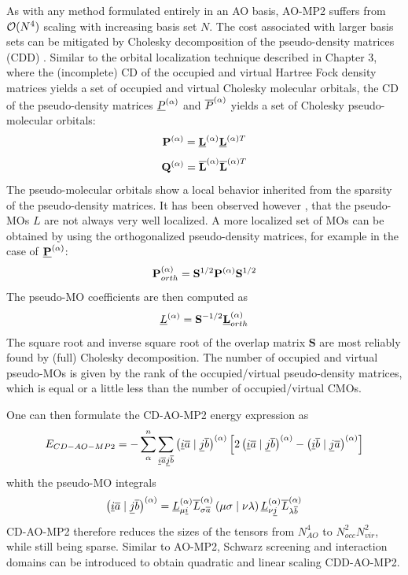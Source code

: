 As with any method formulated entirely in an AO basis, AO-MP2 suffers from $\mathcal{O}(N^{4})$ scaling with increasing basis set $N$. The cost associated with larger basis sets can be mitigated by Cholesky decomposition of the pseudo-density matrices (CDD) \cite{Zie2009}. Similar to the orbital localization technique described in Chapter 3, where the (incomplete) CD of the occupied and virtual Hartree Fock density matrices yields a set of occupied and virtual Cholesky molecular orbitals, the CD of the pseudo-density matrices $\underline{P}^{(\alpha)}$ and $\overline{P}^{(\alpha)}$ yields a set of Cholesky pseudo-molecular orbitals: 
\begin{equation}
\mathbf{P}^{(\alpha)} = \mathbf{\underline{L}}^{(\alpha)} \mathbf{\underline{L}}^{(\alpha)T}
\end{equation}
\begin{equation}
\mathbf{Q}^{(\alpha)} = \mathbf{\overline{L}}^{(\alpha)} \mathbf{\overline{L}}^{(\alpha)T}
\end{equation} 
\noindent The pseudo-molecular orbitals show a local behavior inherited from the sparsity of the pseudo-density matrices. It has been observed however \cite{Lue2017}, that the pseudo-MOs $L$ are not always very well localized. A more localized set of MOs can be obtained by using the orthogonalized pseudo-density matrices, for example in the case of $\mathbf{\underline{P}}^{(\alpha)}$:
\begin{equation}
\mathbf{P}^{(\alpha)}_{orth} = \mathbf{S}^{1/2} \mathbf{P}^{(\alpha)} \mathbf{S}^{1/2}
\end{equation}
\noindent The pseudo-MO coefficients are then computed as
\begin{equation}
\underline{L}^{(\alpha)} = \mathbf{S}^{-1/2} \mathbf{\underline{L}}^{(\alpha)}_{orth}
\end{equation}
\noindent The square root and inverse square root of the overlap matrix $\mathbf{S}$ are most reliably found by (full) Cholesky decomposition. The number of occupied and virtual pseudo-MOs is given by the rank of the occupied/virtual pseudo-density matrices, which is equal or a little less than the number of occupied/virtual CMOs. 

One can then formulate the CD-AO-MP2 energy expression as
\begin{equation}
E_{CD-AO-MP2} = - \sum_{\alpha}^n \sum_{\underline{i}\overline{a}\underline{j}\overline{b}} \left( \underline{i}\overline{a} \mid \underline{j}\overline{b} \right)^{(\alpha)} \left [ 2\left( \underline{i}\overline{a} \mid \underline{j}\overline{b} \right)^{(\alpha)} -  \left( \underline{i}\overline{b} \mid \underline{j}\overline{a} \right)^{(\alpha)} \right]
\end{equation}
\noindent whith the pseudo-MO integrals
\begin{equation}
\left( \underline{i}\overline{a} \mid \underline{j}\overline{b} \right)^{(\alpha)} = \underline{L}^{(\alpha)}_{\mu\underline{i}} \overline{L}^{(\alpha)}_{\sigma\overline{a}} \left( \mu\sigma \mid \nu\lambda \right) \underline{L}^{(\alpha)}_{\nu\underline{j}} \overline{L}^{(\alpha)}_{\lambda\overline{b}}
\end{equation}
\noindent CD-AO-MP2 therefore reduces the sizes of the tensors from $N^{4}_{AO}$ to $N_{occ}^2N_{vir}^2$, while still being sparse. Similar to AO-MP2, Schwarz screening and interaction domains can be introduced to obtain quadratic and linear scaling CDD-AO-MP2.

